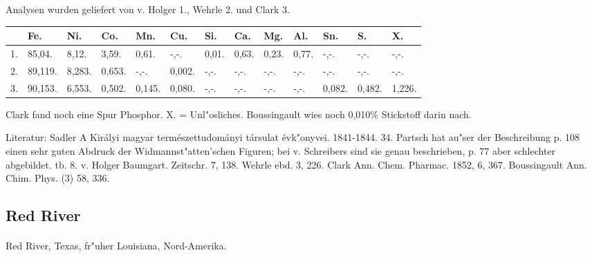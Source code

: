 \documentclass[a4paper, 11pt, oneside]{article}
\begin{document}
Analysen wurden geliefert von v. Holger 1., Wehrle 2. und Clark 3.
\begin{table}[H]
    \centering
    \footnotesize
    \begin{tabular}{p{3mm} p{8mm} p{7mm} p{6mm} p{6mm} p{6mm} p{5mm} p{5mm} p{5mm} p{5mm} p{5mm} p{5mm} p{5mm}}
         & Fe. & Ni. & Co. & Mn. & Cu. & Si. & Ca. & Mg. & Al. & Sn. & S. & X. \\ \hline
        1. & 85,04. & 8,12. & 3,59. & 0,61. & -,-. & 0,01. & 0,63. & 0,23. & 0,77. & -,-. & -,-. & -,-. \\
        2. & 89,119. & 8,283. & 0,653. & -,-. & 0,002. & -,-. & -,-. & -,-. & -,-. & -,-. & -,-. & -,-. \\
        3. & 90,153. & 6,553. & 0,502. & 0,145. & 0,080. & -,-. & -,-. & -,-. & -,-. & 0,082. & 0,482. & 1,226. \\
    \end{tabular}
\end{table}

Clark fand noch eine Spur Phosphor. X. = Unl"osliches. Boussingault wies noch 0,010\% Stickstoff darin nach.

\footnotesize
Literatur: Sadler A Királyi magyar természettudományi társulat évk"onyvei. 1841-1844. 34. Partsch hat au"ser der Beschreibung p. 108 einen sehr guten Abdruck der Widmannst"atten'schen Figuren; bei v. Schreibers sind sie genau beschrieben, p. 77 aber schlechter abgebildet. tb. 8. v. Holger Baumgart. Zeitschr. 7, 138. Wehrle ebd. 3, 226. Clark Ann. Chem. Pharmac. 1852, 6, 367. Boussingault Ann. Chim. Phys. (3) 58, 336.

\subsection{Red River}
\normalsize
\paragraph{}
Red River, Texas, fr"uher Louisiana, Nord-Amerika.
\end{document}
